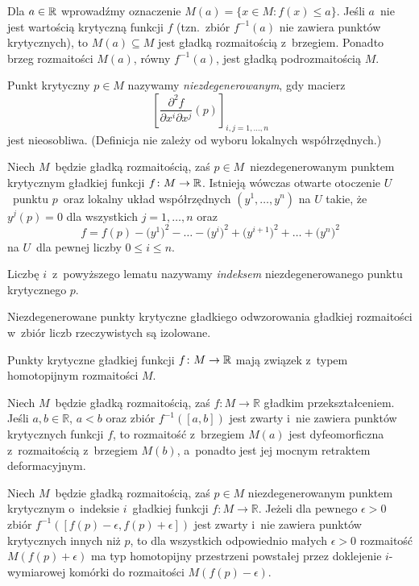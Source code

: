 Dla $a\in\mathbb{R}$ wprowadźmy oznaczenie $M(a)=\{x\in M:f(x)\leq a\}$. Jeśli $a$~nie jest wartością krytyczną funkcji $f$ (tzn.~zbiór $f^{-1}(a)$ nie zawiera punktów krytycznych), to $M(a)\subseteq M$ jest gładką rozmaitością z~brzegiem. Ponadto brzeg rozmaitości $M(a)$, równy $f^{-1}(a)$, jest gładką podrozmaitością $M$.

Punkt krytyczny $p\in M$ nazywamy \textit{niezdegenerowanym}, gdy macierz \[\left[\frac{\partial^2 f}{\partial x^i \partial x^j}(p) \right]_{i,j=1,\ldots,n}\]
jest nieosobliwa. (Definicja nie zależy od wyboru lokalnych współrzędnych.) 

\begin{lem}
Niech $M$~będzie gładką rozmaitością, zaś $p\in M$~niezdegenerowanym punktem krytycznym gładkiej funkcji $f\colon M\to \mathbb{R}$. Istnieją wówczas otwarte otoczenie $U$~punktu $p$~oraz lokalny układ współrzędnych $\left(y^1,\ldots,y^n\right)$ na $U$ takie, że $y^j(p)=0$ dla wszystkich $j=1,\ldots,n$ oraz \[f=f(p)-\bigl(y^1\bigr)^2-\ldots -\bigl(y^i\bigr)^2+\bigl(y^{i+1}\bigr)^2+\ldots+\bigl(y^n\bigr)^2\] na $U$~dla pewnej liczby $0\leq i\leq n$.
\end{lem}

Liczbę $i$~z~powyższego lematu nazywamy \textit{indeksem} niezdegenerowanego punktu krytycznego $p$.

\begin{wn}\label{wn312}
Niezdegenerowane punkty krytyczne gładkiego odwzorowania gładkiej rozmaitości w~zbiór liczb rzeczywistych są izolowane. 
\end{wn}

Punkty krytyczne gładkiej funkcji $f\colon M\to \mathbb{R}$ mają związek z~typem homotopijnym rozmaitości $M$.

\begin{tw}\label{tw313}
Niech $M$~będzie gładką rozmaitością, zaś $f\colon M\to \mathbb{R}$ gładkim przekształceniem. Jeśli $a,b\in\mathbb{R}$, $a<b$ oraz zbiór $f^{-1}([a,b])$ jest zwarty i~nie zawiera punktów krytycznych funkcji $f$, to rozmaitość z~brzegiem $M(a)$ jest dyfeomorficzna z~rozmaitością z~brzegiem $M(b)$, a~ponadto jest jej mocnym retraktem deformacyjnym.
\end{tw}

\begin{tw}\label{tw314}
Niech $M$~będzie gładką rozmaitością, zaś $p\in M$ niezdegenerowanym punktem krytycznym o~indeksie $i$~gładkiej funkcji $f\colon M\to \mathbb{R}$. Jeżeli dla pewnego $\epsilon>0$ zbiór $f^{-1}([f(p)-\epsilon,f(p)+\epsilon])$ jest zwarty i~nie zawiera punktów krytycznych innych niż $p$, to dla wszystkich odpowiednio małych $\epsilon>0$ rozmaitość $M(f(p)+\epsilon)$ ma typ homotopijny przestrzeni powstałej przez doklejenie $i$-wymiarowej komórki do rozmaitości $M(f(p)-\epsilon)$.
\end{tw}

